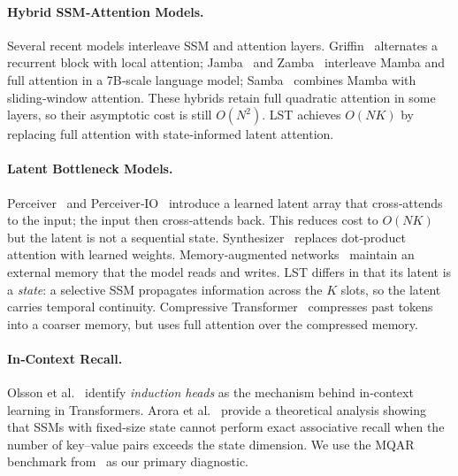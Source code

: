 \documentclass[10pt,twocolumn,letterpaper]{article}
\newcommand{\LST}{\textsc{LST}}
\begin{document}
\paragraph{Hybrid SSM‑Attention Models.}  Several recent models interleave SSM and attention layers.  Griffin~\cite{de2024griffin} alternates a recurrent block with local attention; Jamba~\cite{anthony2024jamba} and Zamba~\cite{zoq2024zamba} interleave Mamba and full attention in a 7B‑scale language model; Samba~\cite{ren2024samba} combines Mamba with sliding‑window attention.  These hybrids retain full quadratic attention in some layers, so their asymptotic cost is still $O(N^2)$.  \LST{} achieves $O(NK)$ by replacing full attention with state‑informed latent attention.

\paragraph{Latent Bottleneck Models.}  Perceiver~\cite{jaegle2021perceiver} and Perceiver‑IO~\cite{jaegle2021perceiverio} introduce a learned latent array that cross‑attends to the input; the input then cross‑attends back.  This reduces cost to $O(NK)$ but the latent is not a sequential state.  Synthesizer~\cite{tay2021synthesizer} replaces dot‑product attention with learned weights.  Memory‑augmented networks~\cite{grave2016improving,sukhbaatar2015end,munkhdalai2017meta} maintain an external memory that the model reads and writes.  \LST{} differs in that its latent is a \emph{state}: a selective SSM propagates information across the $K$ slots, so the latent carries temporal continuity.  Compressive Transformer~\cite{martins2021compressive} compresses past tokens into a coarser memory, but uses full attention over the compressed memory.

\paragraph{In‑Context Recall.}  Olsson et al.~\cite{olsson2022incontext} identify \emph{induction heads} as the mechanism behind in‑context learning in Transformers.  Arora et al.~\cite{arora2024theoretical,arora2023simple} provide a theoretical analysis showing that SSMs with fixed‑size state cannot perform exact associative recall when the number of key–value pairs exceeds the state dimension.  We use the MQAR benchmark from~\cite{arora2023simple} as our primary diagnostic.
\end{document}
